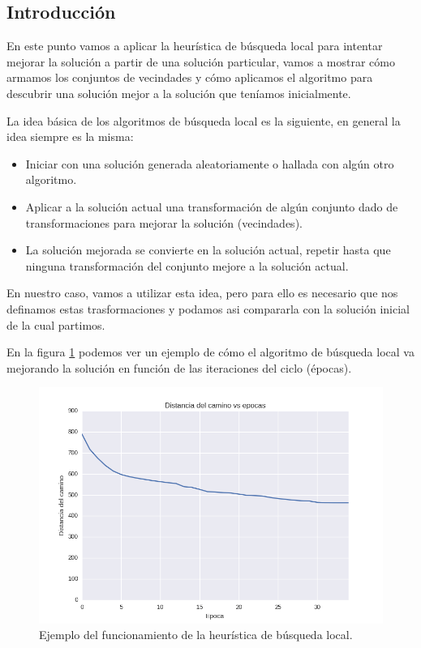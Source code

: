 \subsection{Introducción}

En este punto vamos a aplicar la heurística de búsqueda local para intentar mejorar la solución a partir de una solución particular, vamos a mostrar cómo armamos los conjuntos de vecindades y cómo aplicamos el algoritmo para descubrir una solución mejor a la solución que teníamos inicialmente.

La idea básica de los algoritmos de búsqueda local es la siguiente, en general la idea siempre es la misma:

\begin{itemize}
  \item Iniciar con una solución generada aleatoriamente o hallada con algún otro algoritmo.
  \item Aplicar a la solución actual una transformación de algún conjunto dado de transformaciones para mejorar la solución (vecindades).
  \item La solución mejorada se convierte en la solución actual, repetir hasta que ninguna transformación del conjunto mejore a la solución actual.
\end{itemize}

En nuestro caso, vamos a utilizar esta idea, pero para ello es necesario que nos definamos estas trasformaciones y podamos asi compararla con la solución inicial de la cual partimos.

En la figura \ref{fig: ej3_ejemplo_mejora} podemos ver un ejemplo de cómo el algoritmo de búsqueda local va mejorando la solución en función de las iteraciones del ciclo (épocas).

\begin{figure}[H]
  \begin{center}
    \includegraphics[width=\textwidth]{img/ejercicio3/ejemplo_cambios.png}
    \caption{Ejemplo del funcionamiento de la heurística de búsqueda local.}
    \label{fig: ej3_ejemplo_mejora}
  \end{center}
\end{figure}

